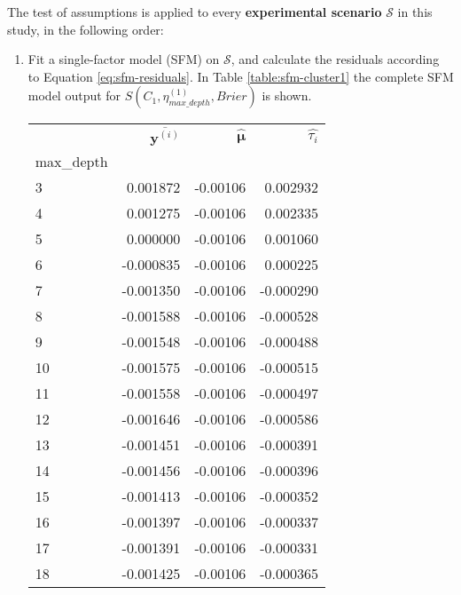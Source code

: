 The test of assumptions is applied to every \textbf{experimental scenario} $\mathcal{S}$ in this study, in the following order:
\newpage
\begin{enumerate}
    \item Fit a single-factor model (SFM) on $\mathcal{S}$, and calculate the residuals according to Equation \ref{eq:sfm-residuals}. In Table \ref{table:sfm-cluster1} the complete SFM model output for $S(C_1, \eta^{(1)}_{max\_depth}, Brier)$ is shown.
    \begin{table}[!h]
        \centering
        \begin{tabular}{lrrr}
            \toprule
            {} &  $\overline{\bm{y}^{(i)}}$ &  $ \hat{\bm{\mu}}$ & $ \hat{\tau_i}$  \\
            max\_depth &                 &          &             \\
            \midrule
            3         &        0.001872 & -0.00106 &    0.002932 \\
            4         &        0.001275 & -0.00106 &    0.002335 \\
            5         &        0.000000 & -0.00106 &    0.001060 \\
            6         &       -0.000835 & -0.00106 &    0.000225 \\
            7         &       -0.001350 & -0.00106 &   -0.000290 \\
            8         &       -0.001588 & -0.00106 &   -0.000528 \\
            9         &       -0.001548 & -0.00106 &   -0.000488 \\
            10        &       -0.001575 & -0.00106 &   -0.000515 \\
            11        &       -0.001558 & -0.00106 &   -0.000497 \\
            12        &       -0.001646 & -0.00106 &   -0.000586 \\
            13        &       -0.001451 & -0.00106 &   -0.000391 \\
            14        &       -0.001456 & -0.00106 &   -0.000396 \\
            15        &       -0.001413 & -0.00106 &   -0.000352 \\
            16        &       -0.001397 & -0.00106 &   -0.000337 \\
            17        &       -0.001391 & -0.00106 &   -0.000331 \\
            18        &       -0.001425 & -0.00106 &   -0.000365 \\

\end{tabular}
\end{table}
\end{enumerate}
